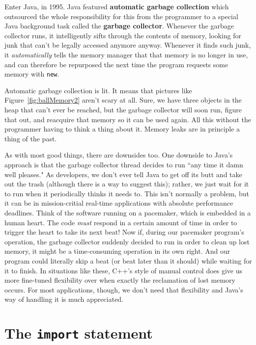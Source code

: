 Enter Java, in 1995. Java featured \textbf{automatic garbage collection} which
outsourced the whole responsibility for this from the programmer to a special
Java background task called the \textbf{garbage collector}. Whenever the
garbage collector runs, it intelligently sifts through the contents of memory,
looking for junk that can't be legally accessed anymore anyway. Whenever it
finds such junk, it \textit{automatically} tells the memory manager that that
memory is no longer in use, and can therefore be repurposed the next time the
program requests some memory with \texttt{new}.

Automatic garbage collection is lit. It means that pictures like
Figure~\ref{fig:ballMemory2} aren't scary at all. Sure, we have three objects
in the heap that can't ever be reached, but the garbage collector will soon
run, figure that out, and reacquire that memory so it can be used again. All
this without the programmer having to think a thing about it. Memory leaks are
in principle a thing of the past.

As with most good things, there are downsides too. One downside to Java's
approach is that the garbage collector thread decides to run ``any time it
damn well pleases." As developers, we don't ever tell Java to get off its butt
and take out the trash (although there is a way to suggest this); rather, we
just wait for it to run when it periodically thinks it needs to. This isn't
normally a problem, but it can be in mission-critial real-time applications
with absolute performance deadlines. Think of the software running on a
pacemaker, which is embedded in a human heart. The code \textit{must} respond
in a certain amount of time in order to trigger the heart to take its next
beat! Now if, during our pacemaker program's operation, the garbage collector
suddenly decided to run in order to clean up lost memory, it might be a
time-consuming operation in its own right. And our program could literally
skip a beat (or beat later than it should) while waiting for it to finish. In
situations like these, C++'s style of manual control does give us more
fine-tuned flexibility over when exactly the reclamation of lost memory
occurs. For most applications, though, we don't need that flexibility and
Java's way of handling it is much appreciated.

\section{The \texttt{import} statement}

